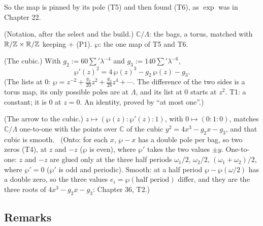 \begin{lines}
So the map is pinned by its pole (T5) and then found (T6), as $\exp$ was in Chapter 22.
\item[\lab{N1}] (Notation, after the select and the build.) $\mathbb{C}/\Lambda$: the bags, a torus, matched with $\mathbb{R}/\mathbb{Z} \times \mathbb{R}/\mathbb{Z}$ keeping $+$ (P1). $\wp$: the one map of T5 and T6.
\item[\lab{T7}] (The cubic.) With $g_2 := 60 \sum' \lambda^{-4}$ and $g_3 := 140 \sum' \lambda^{-6}$, \[ \wp'(z)^2 = 4\,\wp(z)^3 - g_2\, \wp(z) - g_3 . \] (The lists at $0$: $\wp = z^{-2} + \tfrac{g_2}{20} z^2 + \tfrac{g_3}{28} z^4 + \cdots$. The difference of the two sides is a torus map, its only possible poles are at $\Lambda$, and its list at $0$ starts at $z^2$. T1: a constant; it is $0$ at $z = 0$. An identity, proved by ``at most one''.)
\item[\lab{T8}] (The arrow to the cubic.) $z \mapsto (\wp(z) : \wp'(z) : 1)$, with $0 \mapsto (0 : 1 : 0)$, matches $\mathbb{C}/\Lambda$ one-to-one with the points over $\mathbb{C}$ of the cubic $y^2 = 4x^3 - g_2 x - g_3$, and that cubic is smooth. \ (Onto: for each $x$, $\wp - x$ has a double pole per bag, so two zeros (T4), at $z$ and $-z$ ($\wp$ is even), where $\wp'$ takes the two values $\pm y$. One-to-one: $z$ and $-z$ are glued only at the three half periods $\omega_1/2$, $\omega_2/2$, $(\omega_1 + \omega_2)/2$, where $\wp' = 0$ ($\wp'$ is odd and periodic). Smooth: at a half period $\wp - \wp(\omega/2)$ has a double zero, so the three values $e_i = \wp(\text{half period})$ differ, and they are the three roots of $4x^3 - g_2 x - g_3$: Chapter 36, T2.)
\end{lines}

\subsection*{Remarks}

